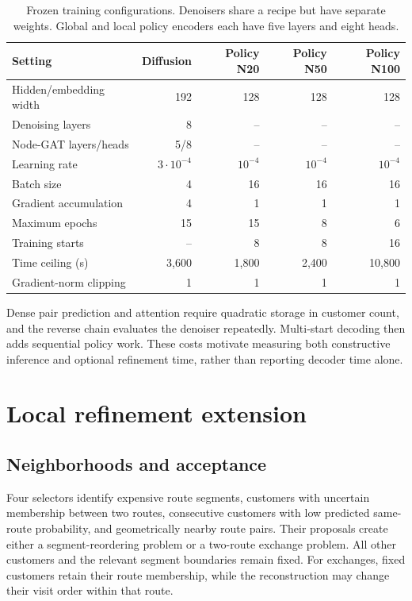 \documentclass[11pt,a4paper]{article}
\begin{document}
\begin{table}[tbp]
\centering\small
\setlength{\tabcolsep}{4pt}
\caption{Frozen training configurations. Denoisers share a recipe but
have separate weights. Global and local policy encoders each have five
layers and eight heads.}
\label{tab:training}
\begin{tabular}{@{}lrrrr@{}}
\toprule
Setting & Diffusion & Policy N20 & Policy N50 & Policy N100\\
\midrule
Hidden/embedding width & 192 & 128 & 128 & 128\\
Denoising layers & 8 & -- & -- & --\\
Node-GAT layers/heads & 5/8 & -- & -- & --\\
Learning rate & $3\cdot10^{-4}$ & $10^{-4}$ & $10^{-4}$ & $10^{-4}$\\
Batch size & 4 & 16 & 16 & 16\\
Gradient accumulation & 4 & 1 & 1 & 1\\
Maximum epochs & 15 & 15 & 8 & 6\\
Training starts & -- & 8 & 8 & 16\\
Time ceiling (s) & 3,600 & 1,800 & 2,400 & 10,800\\
Gradient-norm clipping & 1 & 1 & 1 & 1\\
\bottomrule
\end{tabular}
\end{table}

Dense pair prediction and attention require quadratic storage in customer
count, and the reverse chain evaluates the denoiser repeatedly. Multi-start
decoding then adds sequential policy work. These costs motivate measuring
both constructive inference and optional refinement time, rather than
reporting decoder time alone.

\section{Local refinement extension}
\label{sec:refinement}

\subsection{Neighborhoods and acceptance}

Four selectors identify expensive route segments, customers with uncertain
membership between two routes, consecutive customers with low predicted
same-route probability, and geometrically nearby route pairs. Their proposals
create either a segment-reordering problem or a two-route exchange problem.
All other customers and the relevant segment boundaries remain fixed.
For exchanges, fixed customers retain their route membership, while the
reconstruction may change their visit order within that route.
\end{document}
